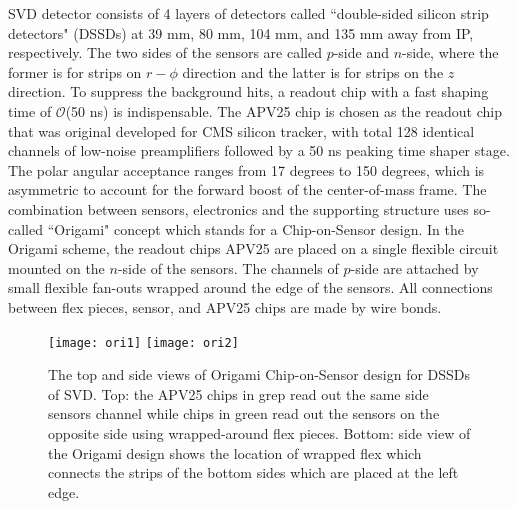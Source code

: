 SVD detector consists of 4 layers of detectors called  ``double-sided silicon strip detectors" (DSSDs) at 39 mm, 80 mm, 104 mm, and 135 mm away from IP, respectively. The two sides of the sensors are called $p$-side and $n$-side, where the former is for strips on $r-\phi$ direction and the latter is for strips on the $z$ direction. To suppress the background hits, a readout chip with a fast shaping time of $\mathcal{O}$(50 ns) is indispensable. The APV25 chip\cite{french2001design} is chosen as the readout chip that was original developed for CMS silicon tracker, with total 128 identical channels of low-noise preamplifiers followed by a 50 ns peaking time shaper stage. The polar angular acceptance ranges from 17 degrees to 150 degrees, which is asymmetric to account for the
forward boost of the center-of-mass frame. The combination between sensors, electronics and the supporting structure uses so-called ``Origami" concept which stands for a Chip-on-Sensor design. In the Origami scheme, the readout chips APV25 are placed on a single flexible circuit mounted on the $n$-side of the sensors. The channels of $p$-side are attached by small flexible fan-outs wrapped around the edge of the sensors. All connections between flex pieces, sensor, and APV25 chips are
made by wire bonds.
\begin{figure}[htpb]
	\centering
	\texttt{[image: ori1]}
	\texttt{[image: ori2]}
	\caption{The top and side views of Origami Chip-on-Sensor design for DSSDs of SVD. Top: the APV25 chips in grep read out the same side sensors channel while chips in green read out the sensors on the opposite side using wrapped-around flex pieces. Bottom: side view of the Origami design shows the location of wrapped flex which connects the strips of the bottom sides which are placed at the left edge.\cite{Abe:2010gxa}}
	\label{fig:origami}
\end{figure}



